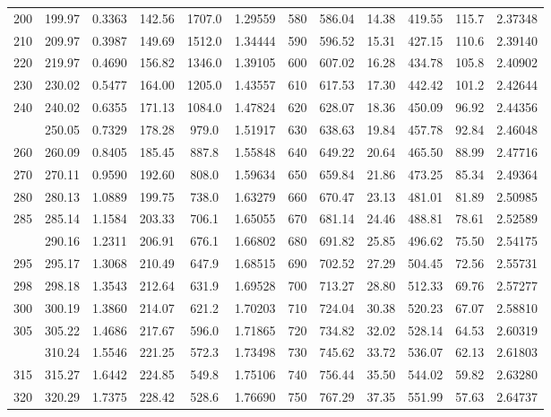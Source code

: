 \documentclass[12pt,a3paper]{article}
\begin{document}
\begin{enumerate}
\begin{center}
\begin{longtable}{cccccc|cccccc}
200 & 199.97 & 0.3363 & 142.56 & 1707.0 & 1.29559 & 580 & 586.04 & 14.38 & 419.55 & 115.7 & 2.37348 \\
210 & 209.97 & 0.3987 & 149.69 & 1512.0 & 1.34444 & 590 & 596.52 & 15.31 & 427.15 & 110.6 & 2.39140 \\
220 & 219.97 & 0.4690 & 156.82 & 1346.0 & 1.39105 & 600 & 607.02 & 16.28 & 434.78 & 105.8 & 2.40902 \\
230 & 230.02 & 0.5477 & 164.00 & 1205.0 & 1.43557 & 610 & 617.53 & 17.30 & 442.42 & 101.2 & 2.42644 \\
240 & 240.02 & 0.6355 & 171.13 & 1084.0 & 1.47824 & 620 & 628.07 & 18.36 & 450.09 & 96.92 & 2.44356 \\
\addlinespace
250 & 250.05 & 0.7329 & 178.28 & 979.0 & 1.51917 & 630 & 638.63 & 19.84 & 457.78 & 92.84 & 2.46048 \\
260 & 260.09 & 0.8405 & 185.45 & 887.8 & 1.55848 & 640 & 649.22 & 20.64 & 465.50 & 88.99 & 2.47716 \\
270 & 270.11 & 0.9590 & 192.60 & 808.0 & 1.59634 & 650 & 659.84 & 21.86 & 473.25 & 85.34 & 2.49364 \\
280 & 280.13 & 1.0889 & 199.75 & 738.0 & 1.63279 & 660 & 670.47 & 23.13 & 481.01 & 81.89 & 2.50985 \\
285 & 285.14 & 1.1584 & 203.33 & 706.1 & 1.65055 & 670 & 681.14 & 24.46 & 488.81 & 78.61 & 2.52589 \\
\addlinespace
290 & 290.16 & 1.2311 & 206.91 & 676.1 & 1.66802 & 680 & 691.82 & 25.85 & 496.62 & 75.50 & 2.54175 \\
295 & 295.17 & 1.3068 & 210.49 & 647.9 & 1.68515 & 690 & 702.52 & 27.29 & 504.45 & 72.56 & 2.55731 \\
298 & 298.18 & 1.3543 & 212.64 & 631.9 & 1.69528 & 700 & 713.27 & 28.80 & 512.33 & 69.76 & 2.57277 \\
300 & 300.19 & 1.3860 & 214.07 & 621.2 & 1.70203 & 710 & 724.04 & 30.38 & 520.23 & 67.07 & 2.58810 \\
305 & 305.22 & 1.4686 & 217.67 & 596.0 & 1.71865 & 720 & 734.82 & 32.02 & 528.14 & 64.53 & 2.60319 \\
\addlinespace
310 & 310.24 & 1.5546 & 221.25 & 572.3 & 1.73498 & 730 & 745.62 & 33.72 & 536.07 & 62.13 & 2.61803 \\
315 & 315.27 & 1.6442 & 224.85 & 549.8 & 1.75106 & 740 & 756.44 & 35.50 & 544.02 & 59.82 & 2.63280 \\
320 & 320.29 & 1.7375 & 228.42 & 528.6 & 1.76690 & 750 & 767.29 & 37.35 & 551.99 & 57.63 & 2.64737 \\

\end{longtable}
\end{center}
\end{enumerate}
\end{document}
